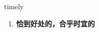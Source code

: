 
\begin{frame}
{\huge timely}
\begin{center}
\begin{enumerate}\Large
  \item \textbf{恰到好处的，合乎时宜的}
\end{enumerate}
\end{center}
\end{frame}
